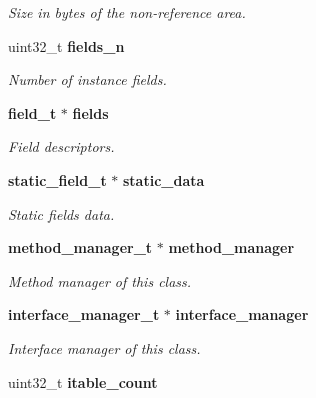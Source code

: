 \begin{DoxyCompactItemize}
\begin{DoxyCompactList}\small\item\em Size in bytes of the non-\/reference area. \item\end{DoxyCompactList}\item 
uint32\_\-t {\bf fields\_\-n}\label{structclass__t_a354149e9fce046d89eb3015c718b7e80}

\begin{DoxyCompactList}\small\item\em Number of instance fields. \item\end{DoxyCompactList}\item 
{\bf field\_\-t} $\ast$ {\bf fields}\label{structclass__t_a89fcd11d1a2b271ea595600eb9fc1c88}

\begin{DoxyCompactList}\small\item\em Field descriptors. \item\end{DoxyCompactList}\item 
{\bf static\_\-field\_\-t} $\ast$ {\bf static\_\-data}\label{structclass__t_a768eb56d1d8b356a22c456c8cd528686}

\begin{DoxyCompactList}\small\item\em Static fields data. \item\end{DoxyCompactList}\item 
{\bf method\_\-manager\_\-t} $\ast$ {\bf method\_\-manager}\label{structclass__t_a2074ca81329732cd3ba97dc0260af47c}

\begin{DoxyCompactList}\small\item\em Method manager of this class. \item\end{DoxyCompactList}\item 
{\bf interface\_\-manager\_\-t} $\ast$ {\bf interface\_\-manager}\label{structclass__t_aafad7fc16adf0616df664e6f3adf7bc8}

\begin{DoxyCompactList}\small\item\em Interface manager of this class. \item\end{DoxyCompactList}\item 
uint32\_\-t {\bf itable\_\-count}\label{structclass__t_a9b70869b31e6d8782b6800a1d7c3abf7}


\end{DoxyCompactItemize}
